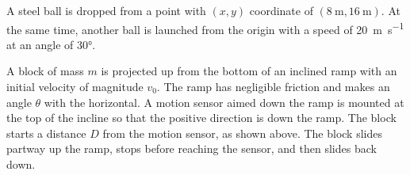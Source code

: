 \documentclass{../../oss-classkick-exam}
\begin{document}
\begin{questions}
\begin{center}
  \end{center}
  \newpage

  \question A steel ball is dropped from a point with $(x,y)$ coordinate of
  $(\SI{8}{\metre},\SI{16}{\metre})$. At the same time, another ball is launched
  from the origin with a speed of \SI{20}{\metre\per\second} at an angle of
  \ang{30}.
  \newpage


  \question A block of mass $m$ is projected up from the bottom of an inclined
  ramp with an initial velocity of magnitude $v_0$. The ramp has negligible
  friction and makes an angle $\theta$ with the horizontal. A motion sensor
  aimed down the ramp is mounted at the top of the incline so that the positive
  direction is down the ramp. The block starts a distance $D$ from the motion
  sensor, as shown above. The block slides partway up the ramp, stops before
  reaching the sensor, and then slides back down.
\end{questions}
\end{document}

